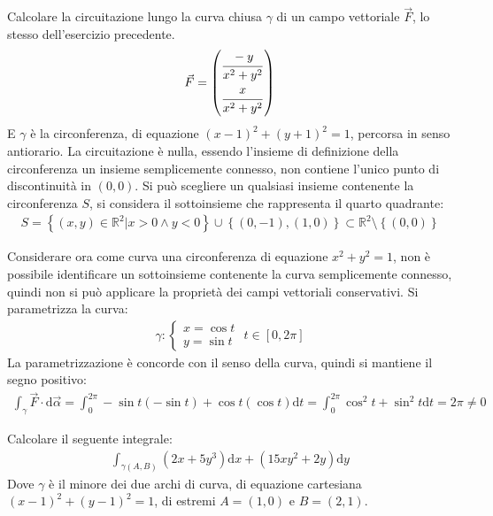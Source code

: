 \documentclass{article}
\newcommand{\df}{\mathrm{d}}
\numberwithin{equation}{subsection}
\begin{document}

Calcolare la circuitazione lungo la curva chiusa $\gamma$ di un campo vettoriale $\vec{F}$, lo stesso dell'esercizio precedente. 
\begin{gather*}
    \vec{F}=\begin{pmatrix}
        \displaystyle\frac{\strut-y}{\strut x^2+y^2}\\ \displaystyle\frac{\strut x}{\strut x^2+y^2}
    \end{pmatrix}
\end{gather*}
E $\gamma$ è la circonferenza, di equazione $(x-1)^2+(y+1)^2=1$, percorsa in senso antiorario. La circuitazione è nulla, essendo l'insieme di definizione della circonferenza un insieme semplicemente connesso, non contiene l'unico punto di discontinuità in $(0,0)$. Si può scegliere un qualsiasi insieme contenente la circonferenza $S$, si considera il sottoinsieme che rappresenta il quarto quadrante:
\begin{gather*}
    S=\left\{(x,y)\in\mathbb{R}^2\big| x>0\land y<0\right\}\cup\left\{(0,-1),(1,0)\right\}\subset\mathbb{R}^2\setminus\left\{(0,0)\right\}
\end{gather*}

Considerare ora come curva una circonferenza di equazione $x^2+y^2=1$, non è possibile identificare un sottoinsieme contenente la curva semplicemente connesso, quindi non si può applicare la proprietà dei campi vettoriali conservativi. 
Si parametrizza la curva:
\begin{gather*}
    \gamma:\begin{cases}
        x=\cos t\\y=\sin t
    \end{cases}\,\, t\in[0,2\pi]
\end{gather*}
La parametrizzazione è concorde con il senso della curva, quindi si mantiene il segno positivo:
\begin{gather*}
    \int_{\gamma}\vec{F}\cdot\df\vec{\alpha}=\int_0^{2\pi}-\sin t(-\sin t)+\cos t(\cos t)\df t=\int_0^{2\pi}\cos^2 t+\sin^2 t\df t=2\pi\neq0
\end{gather*}


Calcolare il seguente integrale:
\begin{gather*}
    \int_{\gamma(A,B)}(2x+5y^3)\df x+(15xy^2+2y)\df y
\end{gather*}
Dove $\gamma$ è il minore dei due archi di curva, di equazione cartesiana $(x-1)^2+(y-1)^2=1$, di estremi $A=(1,0)$ e $B=(2,1)$. 
\end{document}
